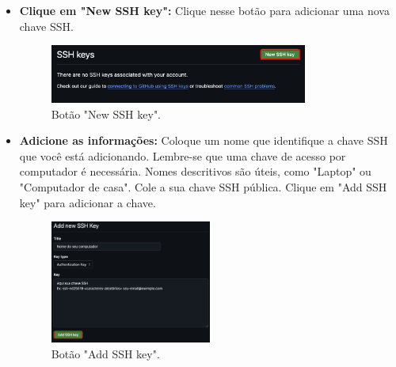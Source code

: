 \begin{itemize}
\item \textbf{Clique em "New SSH key":}
Clique nesse botão para adicionar uma nova chave SSH.

    \begin{figure}[H]
\centering
\includegraphics[width=0.8\textwidth]{imgs/tutorial_criar_conta_github/9_new_ssh_key.png}
\caption{Botão "New SSH key".}
\label{fig:new_ssh_key}
\end{figure}

\item \textbf{Adicione as informações:}
    Coloque um nome que identifique a chave SSH que você está adicionando. Lembre-se que uma chave de acesso por computador é necessária. Nomes descritivos são úteis, como "Laptop" ou "Computador de casa". Cole a sua chave SSH pública. Clique em "Add SSH key" para adicionar a chave.

    \begin{figure}[H]
\centering
\includegraphics[width=0.5\textwidth]{imgs/tutorial_criar_conta_github/10_add_ssh_key.png}
\caption{Botão "Add SSH key".}
\label{fig:add_ssh_key}
\end{figure}

\end{itemize}



